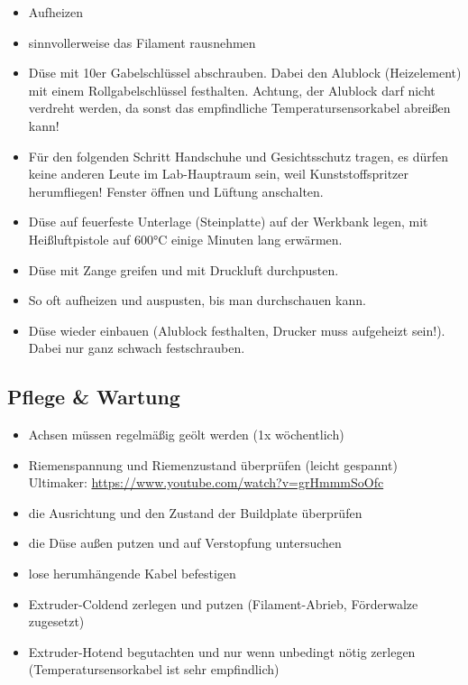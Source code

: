 \documentclass{\basedir/fablab-document}
\begin{document}
\begin{itemize}
 \item Aufheizen
 \item sinnvollerweise das Filament rausnehmen
 \item Düse mit 10er Gabelschlüssel abschrauben. Dabei den Alublock (Heizelement) mit einem Rollgabelschlüssel festhalten. Achtung, der Alublock darf nicht verdreht werden, da sonst das empfindliche Temperatursensorkabel abreißen kann!
 \item Für den folgenden Schritt Handschuhe und Gesichtsschutz tragen, es dürfen keine anderen Leute im Lab-Hauptraum sein, weil Kunststoffspritzer herumfliegen! Fenster öffnen und Lüftung anschalten.
 \item Düse auf feuerfeste Unterlage (Steinplatte) auf der Werkbank legen, mit Heißluftpistole auf 600°C einige Minuten lang erwärmen. 
 \item Düse mit Zange greifen und mit Druckluft durchpusten.
 \item So oft aufheizen und auspusten, bis man durchschauen kann.
 \item Düse wieder einbauen (Alublock festhalten, Drucker muss aufgeheizt sein!). Dabei nur ganz schwach festschrauben.
\end{itemize}


\subsection{Pflege \& Wartung}

\begin{itemize}
\item Achsen müssen regelmäßig geölt werden (1x wöchentlich)
\item Riemenspannung und Riemenzustand überprüfen (leicht gespannt)\\
Ultimaker: \url{https://www.youtube.com/watch?v=grHmmmSoOfc}
\item die Ausrichtung und den Zustand der Buildplate überprüfen
\item die Düse außen putzen und auf Verstopfung untersuchen
\item lose herumhängende Kabel befestigen
\item Extruder-Coldend zerlegen und putzen (Filament-Abrieb, Förderwalze zugesetzt)
\item Extruder-Hotend begutachten und nur wenn unbedingt nötig zerlegen (Temperatursensorkabel ist sehr empfindlich)
\end{itemize}
\end{document}
